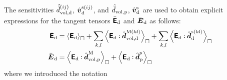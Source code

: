 \documentclass[10pt,a4paper]{article}
\newcommand{\NDIM}{n_\mathrm{dim}}
\newcommand{\ded}{\mathrm{d}}
\newcommand{\dep}{\mathrm{p}}
\begin{document}
%
The sensitivities $\hat{\bar{d}}^{(ij)}_{\vol,\ded}$, $\hat{\ta{v}}^{\fluct(ij)}_\ded$, and $\hat{\bar{d}}_{\vol,\dep}$, $\hat{\ta{v}}^{\fluct}_\ded$ are used to obtain explicit expressions for the tangent tensors
$\bar{\tf E}_\ded$ and $\bar{\ts E}_\ded$ as follows:
\begin{align}
    \bar{\tf E}_\ded
    & = 
    \left\langle \tf{E}_\ded \right\rangle_\Box +
    \sum_{k,l} \left\langle \tf{E}_\ded \dprod \hat{\ts{d}}^{\macro(kl)}_{\vol,\ded}\right\rangle_\Box +
    \sum_{k,l} \left\langle \tf{E}_\ded \dprod \hat{\ts{d}}^{\fluct(kl)}_\ded\right\rangle_\Box
\label{eq224a} \\
    \bar{\ts E}_\ded
    & = 
    \left\langle \tf{E}_\ded \dprod \hat{\ts{d}}^{\macro}_{\vol,\dep}\right\rangle_\Box +
    \left\langle \tf{E}_\ded \dprod \hat{\ts{d}}^{\fluct}_\dep\right\rangle_\Box
\label{eq224b}
\end{align}
where we introduced the notation
\end{document}
